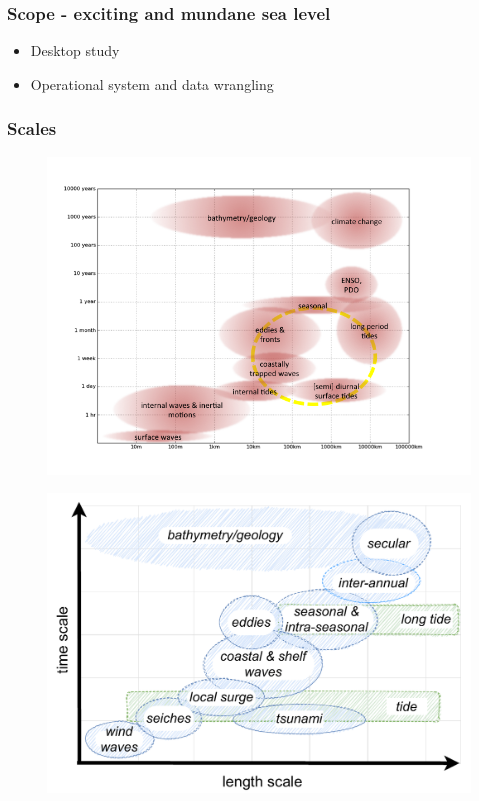 \begin{frame}
\frametitle{Scope - exciting and mundane sea level}
\begin{itemize}
    \item Desktop study
    \item Operational system and data wrangling
\end{itemize}
\end{frame}
\begin{frame}
\frametitle{Scales}
\begin{minipage}{0.45\textwidth}
    \begin{figure}      
    \includegraphics[width=\textwidth]{figures/diagrams/ocean_scales.png}
    \end{figure}
\end{minipage}
\hfill
\begin{minipage}{0.45\textwidth}
    \begin{figure}      
     \includegraphics[width=\textwidth]{figures/diagrams/scales_time_length.pdf}
    \end{figure} 
\end{minipage}
\end{frame}
